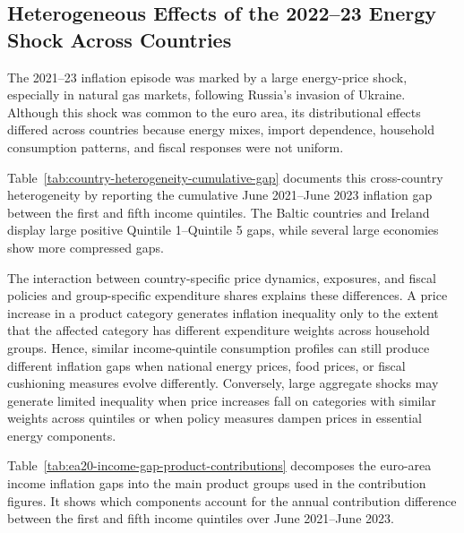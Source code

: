 \documentclass[11pt]{article}
\begin{document}
\subsection{Heterogeneous Effects of the 2022--23 Energy Shock Across Countries}



The 2021--23 inflation episode was marked by a large energy-price shock, especially in natural gas markets,
following Russia's invasion of Ukraine. Although this shock was common to the euro area, its
distributional effects differed across countries because energy mixes, import dependence, household
consumption patterns, and fiscal responses were not uniform.

Table~\ref{tab:country-heterogeneity-cumulative-gap} documents this cross-country heterogeneity by
reporting the cumulative June 2021--June 2023 inflation gap between the first and fifth income quintiles. The
Baltic countries and Ireland display large positive Quintile 1--Quintile 5 gaps, while several large
economies show more compressed gaps.

The interaction between country-specific price dynamics, exposures, and fiscal policies and
group-specific expenditure shares explains these differences. A price increase in a product category generates inflation inequality only to
the extent that the affected category has different expenditure weights across household groups.
Hence, similar income-quintile consumption profiles can still produce different inflation gaps when
national energy prices, food prices, or fiscal cushioning measures evolve differently. Conversely,
large aggregate shocks may generate limited inequality when price increases fall on categories with
similar weights across quintiles or when policy measures dampen prices in essential energy
components.




Table~\ref{tab:ea20-income-gap-product-contributions} decomposes the euro-area income
inflation gaps into the main product groups used in the contribution figures. It shows which
components account for the annual contribution difference between the first and fifth income
quintiles over June 2021--June 2023.
\end{document}

